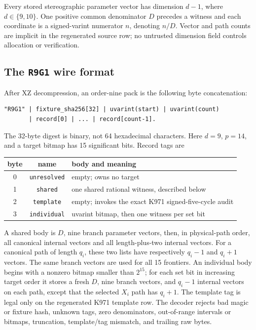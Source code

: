 \documentclass[11pt]{article}
\theoremstyle{definition}
\theoremstyle{remark}
\begin{document}
Every stored stereographic parameter vector has dimension $d-1$, where
$d\in\{9,10\}$.  One positive common denominator $D$ precedes a witness and
each coordinate is a signed-varint numerator $n$, denoting $n/D$.  Vector and
path counts are implicit in the regenerated source row; no untrusted dimension
field controls allocation or verification.

\subsection{The \texttt{R9G1} wire format}

After XZ decompression, an order-nine pack is the following byte concatenation:
\begin{verbatim}
"R9G1" | fixture_sha256[32] | uvarint(start) | uvarint(count)
       | record[0] | ... | record[count-1].
\end{verbatim}
The 32-byte digest is binary, not 64 hexadecimal characters.  Here $d=9$,
$p=14$, and a target bitmap has 15 significant bits.  Record tags are
\begin{center}
\begin{tabular}{ccl}
\toprule
byte&name&body and meaning\\
\midrule
0&\texttt{unresolved}&empty; owns no target\\
1&\texttt{shared}&one shared rational witness, described below\\
2&\texttt{template}&empty; invokes the exact K971 signed-five-cycle audit\\
3&\texttt{individual}&uvarint bitmap, then one witness per set bit\\
\bottomrule
\end{tabular}
\end{center}
A shared body is $D$, nine branch parameter vectors, then, in physical-path
order, all canonical internal vectors and all length-plus-two internal vectors.
For a canonical path of length $q_i$, these two lists have respectively
$q_i-1$ and $q_i+1$ vectors.  The same branch vectors are used for all 15
frontiers.  An individual body begins with a nonzero bitmap smaller than
$2^{15}$; for each set bit in increasing target order it stores a fresh $D$,
nine branch vectors, and $q_i-1$ internal vectors on each path, except that the
selected $X_i$ path has $q_i+1$.  The template tag is legal only on the
regenerated K971 template row.  The decoder rejects bad magic or fixture hash,
unknown tags, zero denominators, out-of-range intervals or bitmaps, truncation,
template/tag mismatch, and trailing raw bytes.
\end{document}
